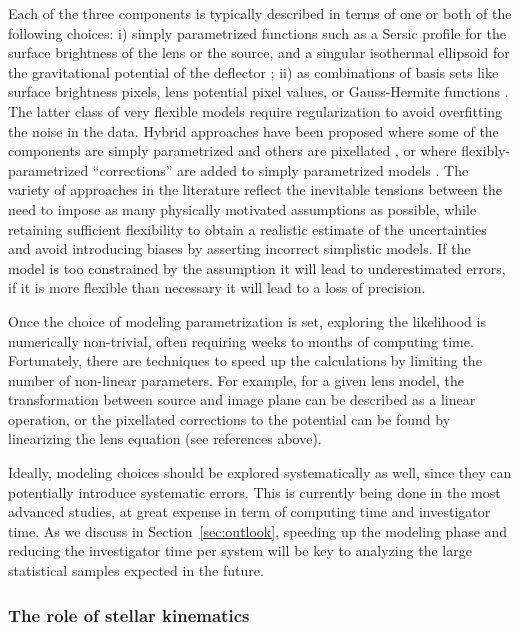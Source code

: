 Each of the three components is typically described in terms of one or
both of the following choices:
i) simply parametrized functions such as a Sersic profile
for the surface brightness of the lens or the source, and a singular
isothermal ellipsoid for the gravitational potential of the deflector
\citep[e.g.][]{Mar++07,Kne++11,Kee11}; ii) as combinations of basis sets like surface brightness
pixels, lens potential pixel values, or Gauss-Hermite functions
\citep[e.g.][]{Col08, BirrerEtal2015, Nig++15}. The latter class of
very flexible models require regularization to avoid overfitting the
noise in the data. Hybrid approaches have been proposed where some of
the components are simply parametrized and others are pixellated
\citep{W+D03,T+K04,Suy++06}, or where flexibly-parametrized
``corrections'' are added to simply
parametrized models \citep{Koo05,V+K09,S+H10,Suy++10,BirrerEtal2015}.
The variety of
approaches in the literature reflect the inevitable tensions between
the need to impose as many physically motivated assumptions as
possible, while retaining sufficient flexibility to obtain a realistic
estimate of the uncertainties and avoid introducing biases by
asserting incorrect simplistic models. If the model is too constrained by the
assumption it will lead to underestimated errors, if it is more
flexible than necessary it will lead to a loss of precision.

Once the choice of modeling parametrization is set, exploring the
likelihood is numerically non-trivial, often requiring weeks to months
of computing time. Fortunately, there are techniques to speed up the
calculations by limiting the number of non-linear parameters. For
example, for a given lens model, the transformation between source and
image plane can be described as a linear operation, or the pixellated
corrections to the potential can be found by linearizing the lens
equation (see references above).

Ideally, modeling choices should be explored systematically as well,
since they can potentially introduce systematic errors. This is
currently being done in the most advanced studies, at great expense in
term of computing time and investigator time. As we discuss in
Section~\ref{sec:outlook}, speeding up the modeling phase and reducing
the investigator time per system will be key to analyzing the large
statistical samples expected in the future.


\subsubsection{The role of stellar kinematics}

